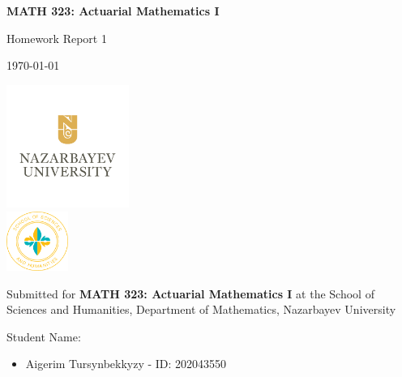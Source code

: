 \documentclass[12pt, a4paper]{article}
\begin{document}
\begin{titlepage}
    \centering
    
    \vspace*{0.5cm}
    
    {\Large\bfseries MATH 323: Actuarial Mathematics I\par}
    
    \vspace{1cm}
    
    {\large Homework Report 1\par}
    
    \vspace{0.5cm}
    
    {\today\par}
    
    \vspace{1pt}
    
    \includegraphics[width=0.3\textwidth]{NU-logo.png}\\
    \includegraphics[width=0.15\textwidth]{sosah-logo.png}

    \vspace{0.5cm}
    
    Submitted for {\bf MATH 323: Actuarial Mathematics I} at the School of Sciences and Humanities, Department of Mathematics, Nazarbayev University
    
    \vspace{0.5cm}
    
    {\large Student Name:\par}
    \begin{itemize}[leftmargin=5cm,rightmargin=4cm]
        \item  Aigerim Tursynbekkyzy - ID: 202043550
    \end{itemize}

    \vspace{0.5cm}
    

\end{titlepage}
\end{document}
